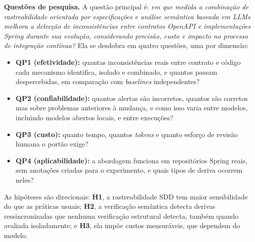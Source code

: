 \documentclass[12pt]{article}
\begin{document}
\textbf{Questões de pesquisa.} A questão principal é: \textit{em que medida a combinação de rastreabilidade orientada por especificações e análise semântica baseada em LLMs melhora a detecção de inconsistências entre contratos OpenAPI e implementações Spring durante sua evolução, considerando precisão, custo e impacto no processo de integração contínua?} Ela se desdobra em quatro questões, uma por dimensão:
\begin{itemize}[noitemsep, topsep=3pt, leftmargin=1.5em]
  \item \textbf{QP1 (efetividade):} quantas inconsistências reais entre contrato e código cada mecanismo identifica, isolado e combinado, e quantas passam despercebidas, em comparação com \textit{baselines} independentes?
  \item \textbf{QP2 (confiabilidade):} quantos alertas são incorretos, quantos são corretos mas sobre problemas anteriores à mudança, e como isso varia entre modelos, incluindo modelos abertos locais, e entre execuções?
  \item \textbf{QP3 (custo):} quanto tempo, quantos \textit{tokens} e quanto esforço de revisão humana o portão exige?
  \item \textbf{QP4 (aplicabilidade):} a abordagem funciona em repositórios Spring reais, sem anotações criadas para o experimento, e quais tipos de deriva ocorrem neles?
\end{itemize}

As hipóteses são direcionais: \textbf{H1}, a rastreabilidade SDD tem maior sensibilidade do que as práticas usuais; \textbf{H2}, a verificação semântica detecta derivas ressincronizadas que nenhuma verificação estrutural detecta, também quando avaliada isoladamente; e \textbf{H3}, ela impõe custos mensuráveis, que dependem do modelo.
\end{document}
